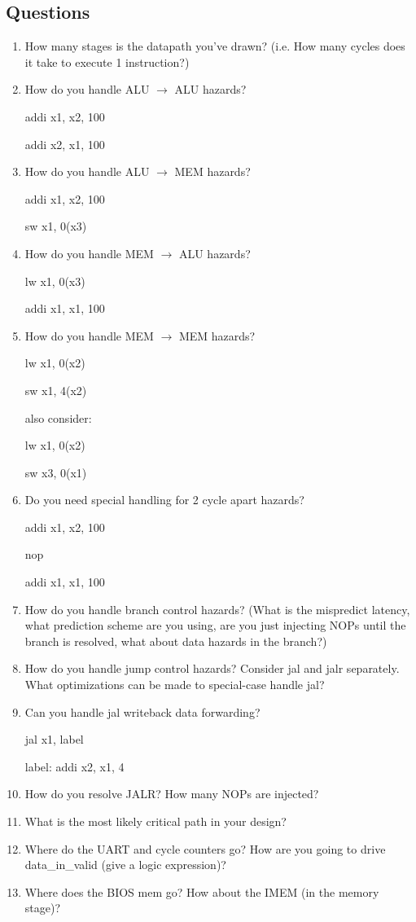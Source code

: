 \documentclass[11pt]{article}
\begin{document}
\subsection{Questions}\label{sec:chkpt1_questions}
\begin{enumerate}
\item How many stages is the datapath you've drawn? (i.e. How many cycles does it take to execute 1 instruction?)
\item How do you handle ALU $\rightarrow$ ALU hazards?

addi x1, x2, 100

addi x2, x1, 100

\item How do you handle ALU $\rightarrow$ MEM hazards?

addi x1, x2, 100

sw x1, 0(x3)

\item How do you handle MEM $\rightarrow$ ALU hazards?

lw x1, 0(x3)

addi x1, x1, 100

\item How do you handle MEM $\rightarrow$ MEM hazards?

lw x1, 0(x2)

sw x1, 4(x2)

also consider:

lw x1, 0(x2)

sw x3, 0(x1)

\item Do you need special handling for 2 cycle apart hazards?

addi x1, x2, 100

 nop

 addi x1, x1, 100

\item How do you handle branch control hazards? (What is the mispredict latency, what prediction scheme are you using, are you just injecting NOPs until the branch is resolved, what about data hazards in the branch?)
\item How do you handle jump control hazards? Consider jal and jalr separately. What optimizations can be made to special-case handle jal? 
\item Can you handle jal writeback data forwarding?

jal x1, label

label: addi x2, x1, 4

\item How do you resolve JALR? How many NOPs are injected?
\item What is the most likely critical path in your design?
\item Where do the UART and cycle counters go? How are you going to drive data\_in\_valid (give a logic expression)?
\item Where does the BIOS mem go? How about the IMEM (in the memory stage)?
\end{enumerate}
\end{document}
